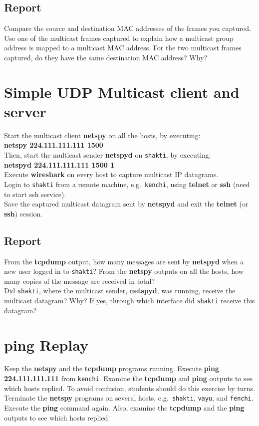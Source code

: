 \documentclass[10pt,a4paper]{article}
\numberwithin{equation}{section}
\numberwithin{figure}{section}
\numberwithin{table}{section}
\begin{document}
    \subsection*{Report}
    Compare the source and destination MAC addresses of the frames you captured. \\
    Use one of the multicast frames captured to explain how a multicast group address is mapped to a multicast MAC address.
    For the two multicast frames captured, do they have the same destination MAC address?
    Why?

\section{Simple UDP Multicast client and server}
    Start the multicast client \textbf{netspy} on all the hosts, by executing: \\
    \textbf{netspy 224.111.111.111 1500} \\
    Then, start the multicast sender \textbf{netspyd} on \texttt{shakti}, by executing: \\
    \textbf{netspyd 224.111.111.111 1500 1} \\
    Execute \textbf{wireshark} on every host to capture multicast IP datagrams. \\
    Login to \texttt{shakti} from a remote machine, e.g.\  \texttt{kenchi}, using \textbf{telnet} or \textbf{ssh} (need to start ssh service). \\
    Save the captured multicast datagram sent by \textbf{netspyd} and exit the \textbf{telnet} (or \textbf{ssh}) session.

    \subsection*{Report}
    From the \textbf{tcpdump} output, how many messages are sent by \textbf{netspyd} when a new user logged in to \texttt{shakti}?
    From the \textbf{netspy} outputs on all the hosts, how many copies of the message are received in total? \\
    Did \texttt{shakti}, where the multicast sender, \textbf{netspyd}, was running, receive the multicast datagram?
    Why?
    If yes, through which interface did \texttt{shakti} receive this datagram?

\section{ping Replay}
    Keep the \textbf{netspy} and the \textbf{tcpdump} programs running.
    Execute \textbf{ping 224.111.111.111} from \texttt{kenchi}.
    Examine the \textbf{tcpdump} and \textbf{ping} outputs to see which hosts replied.
    To avoid confusion, students should do this exercise by turns.
    Terminate the \textbf{netspy} programs on several hosts, e.g.\  \texttt{shakti}, \texttt{vayu}, and \texttt{fenchi}.
    Execute the \textbf{ping} command again.
    Also, examine the \textbf{tcpdump} and the \textbf{ping} outputs to see which hosts replied.
\end{document}
